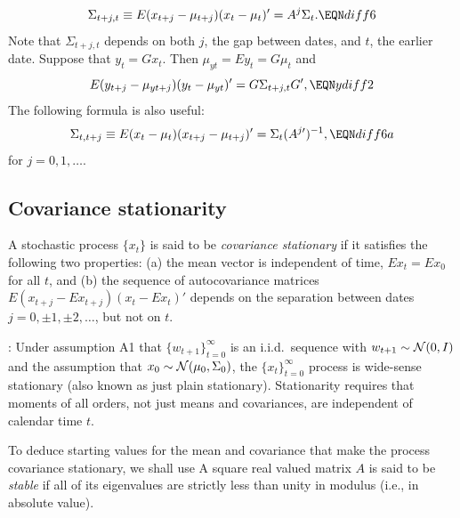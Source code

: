 $$ \Sigma_{t+j,t} \equiv E (x_{t+j} - \mu_{t+j}) (x_t - \mu_t)' =
       A^j \Sigma_t. \EQN diff6 $$
Note that $\Sigma_{t+j,t}$ depends on both $j$, the gap between dates, and $t$, the earlier
date.
%
Suppose that $y_t = G x_t$.  Then
 $\mu_{yt}= E y_t = G \mu_t$ and
$$ E (y_{t+j} - \mu_{yt+j}) (y_t - \mu_{yt})'
                              = G \Sigma_{t+j,t} G',  \EQN ydiff2  $$
The following formula is also  useful:
$$ \Sigma_{t,t+j} \equiv E (x_t - \mu_t) (x_{t+j} - \mu_{t+j}) ' =
       \Sigma_t (A^{j \prime})^{-1 },  \EQN diff6a $$
       for $j=0, 1,\ldots$.


\subsection{Covariance stationarity}

%
\medskip
  A stochastic process $\{x_t\}$ is said to
be {\it covariance stationary\/} if it
satisfies the following two properties: (a) the mean vector is
independent of time,
 $ E x_t = E x_0$ for all $t$,
 and (b) the sequence of autocovariance matrices
 $E(x_{t+j} - E x_{t+j})(x_t - E x_t)'$
depends on the separation between dates
 $j = 0, \pm 1, \pm 2, \ldots$, but not on $t$.
\enddefinition
\smallskip


:  Under assumption A1 that $\{w_{t+1}\}_{t=0}^\infty $ is an i.i.d.~sequence
with $w_{t+1} \sim {\cal N}(0,I)$ and the assumption that $x_0 \sim {\cal N}(\mu_0, \Sigma_0)$,
the $\{x_t\}_{t=0}^\infty$ process is wide-sense stationary (also known as  just plain stationary).  Stationarity
requires that moments of all orders, not just means and covariances,  are independent of calendar time $t$.


\medskip


\noindent To  deduce
starting values for the mean and covariance
that make the process covariance
stationary, we shall use
A square real valued matrix $A$ is said to be {\it stable\/} if
all of its eigenvalues   are strictly less than
unity in modulus (i.e., in absolute value).
\enddefinition
\smallskip

